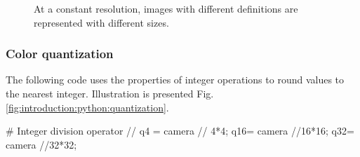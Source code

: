 \begin{figure}[H]
 \centering\caption{At a constant resolution, images with different definitions are represented with different sizes.}%
 \hspace{1cm}
 \hspace{1cm}
 \label{fig:introduction:python:resolution}%
\end{figure}


\subsubsection{Color quantization}
The following code uses the properties of integer operations to round values to the nearest integer. Illustration is presented Fig. \ref{fig:introduction:python:quantization}.

\begin{python}
# Integer division operator //
q4 = camera // 4*4;
q16= camera //16*16;
q32= camera //32*32;
\end{python}

\vspace*{-3mm}


